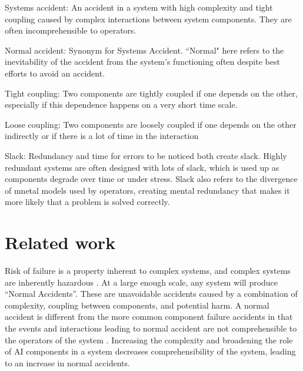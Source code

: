\documentclass[11pt]{article}
\begin{document}
Systems accident: An accident in a system with high complexity and tight coupling caused by complex
interactions between system components. They are often incomprehensible to operators.
\cite{perrow1999living}

Normal accident: Synonym for Systems Accident. ``Normal" here refers to the inevitability of the
accident from the system's functioning often despite best efforts to avoid an accident.

Tight coupling: Two components are tightly coupled if one depends on the other, especially if this
dependence happens on a very short time scale.

Loose coupling: Two components are loosely coupled if one depends on the other indirectly or if there
is a lot of time in the interaction

Slack: Redundancy and time for errors to be noticed both create slack. Highly redundant systems are
often designed with lots of slack, which is used up as components degrade over time or under
stress. Slack also refers to the divergence of mnetal models used by operators, creating mental
redundancy that makes it more likely that a problem is solved correctly.

\section{Related work}


Risk of failure is a property inherent to complex systems, and complex systems are inherently
hazardous \cite{cook1998complex}.  At a large enough scale, any system will produce ``Normal
Accidents''. These are unavoidable accidents caused by a combination of complexity, coupling between
components, and potential harm. A normal accident is different from the more common component
failure accidents in that the events and interactions leading to normal accident are not
comprehensible to the operators of the system \cite{perrow1984living}. Increasing the complexity
and broadening the role of AI components in a system decreases comprehensibility of the system,
leading to an increase in normal accidents.
\end{document}
